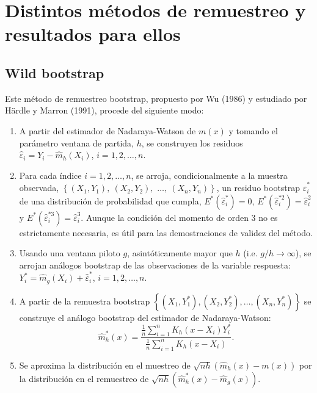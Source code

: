 \documentclass[]{book}
\theoremstyle{definition}
\theoremstyle{definition}
\theoremstyle{definition}
\theoremstyle{remark}
\begin{document}
\section{Distintos métodos de remuestreo y resultados para
ellos}\label{distintos-metodos-de-remuestreo-y-resultados-para-ellos}

\subsection{Wild bootstrap}\label{wild-bootstrap}

Este método de remuestreo bootstrap, propuesto por Wu (1986) y estudiado
por Härdle y Marron (1991), procede del siguiente modo:

\begin{enumerate}
\def\labelenumi{\arabic{enumi}.}
\item
  A partir del estimador de Nadaraya-Watson de \(m\left( x \right)\) y
  tomando el parámetro ventana de partida, \(h\), se construyen los
  residuos
  \(\hat{\varepsilon}_i = Y_i - \hat{m}_{h}\left( X_i \right)\),
  \(i=1, 2, \ldots, n\).
\item
  Para cada índice \(i=1,2,\ldots ,n\), se arroja, condicionalmente a la
  muestra observada,
  \(\left\{ \left( X_1,Y_1 \right), \ \left( X_2,Y_2 \right),\right.\)
  \(\left.\ldots ,\ \left( X_n,Y_n \right) \right\}\), un residuo
  bootstrap \(\hat{\varepsilon}_i^{\ast}\) de una distribución de
  probabilidad que cumpla,
  \(E^{\ast}\left( \hat{\varepsilon}_i^{\ast} \right) =0\),
  \(E^{\ast}\left( \hat{\varepsilon}_i^{\ast 2} \right) =\hat{ \varepsilon}_i^2\)
  y
  \(E^{\ast}\left( \hat{\varepsilon}_i^{\ast 3} \right) =\hat{\varepsilon}_i^{3}\).
  Aunque la condición del momento de orden 3 no es estrictamente
  necesaria, es útil para las demostraciones de validez del método.
\item
  Usando una ventana piloto \(g\), asintóticamente mayor que \(h\) (i.e.
  \(g/h\rightarrow \infty\)), se arrojan análogos bootstrap de las
  observaciones de la variable respuesta:
  \(Y_i^{\ast}=\hat{m}_{g}\left(X_i \right)  +\hat{\varepsilon}_i^{\ast}\),
  \(i=1,2,\ldots ,n\).
\item
  A partir de la remuestra bootstrap
  \(\left\{ \left( X_1,Y_1^{\ast } \right),\left( X_2,Y_2^{\ast} \right),\ldots ,\left( X_n,Y_n^{\ast} \right) \right\}\)
  se construye el análogo bootstrap del estimador de Nadaraya-Watson:
  \[\hat{m}_{h}^{\ast}\left( x \right) =\frac{\frac{1}{n}\sum_{i=1}^{n}K_{h}
  \left( x-X_i \right) Y_i^{\ast}}{\frac{1}{n}\sum_{i=1}^{n}K_{h}\left(
  x-X_i \right)}.\]
\item
  Se aproxima la distribución en el muestreo de
  \(\sqrt{nh}\left( \hat{m}_{h}\left( x \right) -m\left( x \right) \right)\)
  por la distribución en el remuestreo de
  \(\sqrt{nh}\left( \hat{m}_{h}^{\ast}\left( x \right) - \hat{m}_{g}\left( x \right) \right)\).
\end{enumerate}
\end{document}
